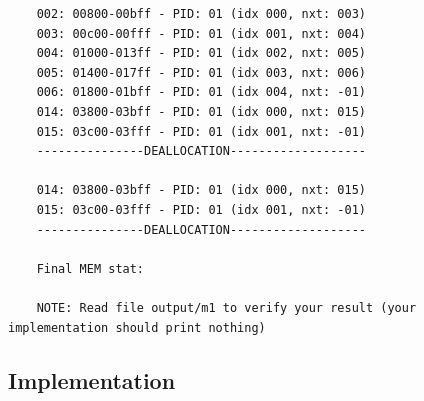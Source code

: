 \documentclass[a4paper]{article}
\begin{document}
\begin{lstlisting}
    002: 00800-00bff - PID: 01 (idx 000, nxt: 003)
    003: 00c00-00fff - PID: 01 (idx 001, nxt: 004)
    004: 01000-013ff - PID: 01 (idx 002, nxt: 005)
    005: 01400-017ff - PID: 01 (idx 003, nxt: 006)
    006: 01800-01bff - PID: 01 (idx 004, nxt: -01)
    014: 03800-03bff - PID: 01 (idx 000, nxt: 015)
    015: 03c00-03fff - PID: 01 (idx 001, nxt: -01)
    ---------------DEALLOCATION-------------------
    
    014: 03800-03bff - PID: 01 (idx 000, nxt: 015)
    015: 03c00-03fff - PID: 01 (idx 001, nxt: -01)
    ---------------DEALLOCATION-------------------
    
    Final MEM stat: 
    
    NOTE: Read file output/m1 to verify your result (your implementation should print nothing)
    \end{lstlisting}
	\subsection{Implementation}
\end{document}
